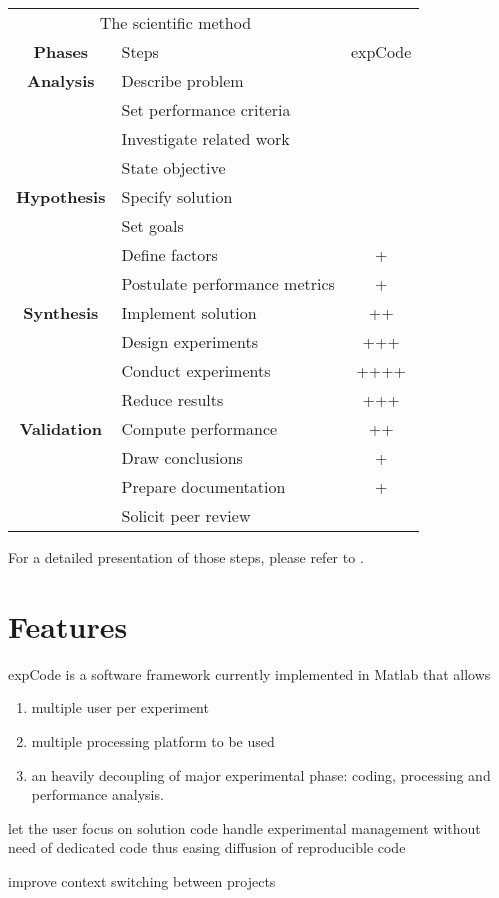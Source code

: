\documentclass[10pt,a4paper,fleqn]{article}
\newcommand{\expcode}{\textsf{expCode} }
\begin{document}
\vspace{1em}
\begin{tabular}{clc}
\multicolumn{2}{c}{The scientific method} \\
\bf Phases & Steps  & \expcode \\
\hline
\bf Analysis & Describe problem & \\
& Set performance criteria & \\
& Investigate related work & \\
& State objective & \\
\bf Hypothesis & Specify solution & \\
& Set goals & \\
& Define factors & + \\
& Postulate performance metrics & + \\
\bf Synthesis & Implement solution & ++ \\
& Design experiments & +++ \\
& Conduct experiments & ++++ \\
& Reduce results & +++ \\
\bf Validation & Compute performance & ++ \\
& Draw conclusions & +\\
& Prepare documentation & + \\
& Solicit peer review & \\
\end{tabular}

For a detailed presentation of those steps, please refer to \cite{}.

\section{Features}

\expcode is a software framework currently implemented in Matlab that allows
\begin{enumerate}
\item multiple user per experiment
\item multiple processing platform to be used
\item an heavily decoupling of major experimental phase: coding, processing and performance analysis.
\end{enumerate}

let the user focus on solution code
handle experimental management without need of dedicated code
thus easing diffusion of reproducible code


improve context switching between projects
\end{document}
